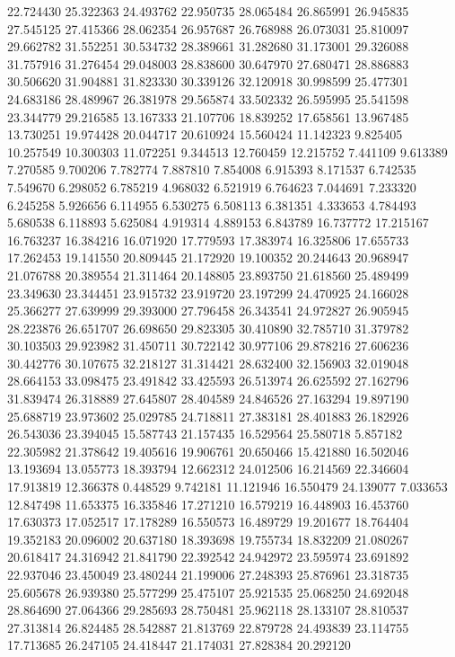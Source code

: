 22.724430
25.322363
24.493762
22.950735
28.065484
26.865991
26.945835
27.545125
27.415366
28.062354
26.957687
26.768988
26.073031
25.810097
29.662782
31.552251
30.534732
28.389661
31.282680
31.173001
29.326088
31.757916
31.276454
29.048003
28.838600
30.647970
27.680471
28.886883
30.506620
31.904881
31.823330
30.339126
32.120918
30.998599
25.477301
24.683186
28.489967
26.381978
29.565874
33.502332
26.595995
25.541598
23.344779
29.216585
13.167333
21.107706
18.839252
17.658561
13.967485
13.730251
19.974428
20.044717
20.610924
15.560424
11.142323
9.825405
10.257549
10.300303
11.072251
9.344513
12.760459
12.215752
7.441109
9.613389
7.270585
9.700206
7.782774
7.887810
7.854008
6.915393
8.171537
6.742535
7.549670
6.298052
6.785219
4.968032
6.521919
6.764623
7.044691
7.233320
6.245258
5.926656
6.114955
6.530275
6.508113
6.381351
4.333653
4.784493
5.680538
6.118893
5.625084
4.919314
4.889153
6.843789
16.737772
17.215167
16.763237
16.384216
16.071920
17.779593
17.383974
16.325806
17.655733
17.262453
19.141550
20.809445
21.172920
19.100352
20.244643
20.968947
21.076788
20.389554
21.311464
20.148805
23.893750
21.618560
25.489499
23.349630
23.344451
23.915732
23.919720
23.197299
24.470925
24.166028
25.366277
27.639999
29.393000
27.796458
26.343541
24.972827
26.905945
28.223876
26.651707
26.698650
29.823305
30.410890
32.785710
31.379782
30.103503
29.923982
31.450711
30.722142
30.977106
29.878216
27.606236
30.442776
30.107675
32.218127
31.314421
28.632400
32.156903
32.019048
28.664153
33.098475
23.491842
33.425593
26.513974
26.625592
27.162796
31.839474
26.318889
27.645807
28.404589
24.846526
27.163294
19.897190
25.688719
23.973602
25.029785
24.718811
27.383181
28.401883
26.182926
26.543036
23.394045
15.587743
21.157435
16.529564
25.580718
5.857182
22.305982
21.378642
19.405616
19.906761
20.650466
15.421880
16.502046
13.193694
13.055773
18.393794
12.662312
24.012506
16.214569
22.346604
17.913819
12.366378
0.448529
9.742181
11.121946
16.550479
24.139077
7.033653
12.847498
11.653375
16.335846
17.271210
16.579219
16.448903
16.453760
17.630373
17.052517
17.178289
16.550573
16.489729
19.201677
18.764404
19.352183
20.096002
20.637180
18.393698
19.755734
18.832209
21.080267
20.618417
24.316942
21.841790
22.392542
24.942972
23.595974
23.691892
22.937046
23.450049
23.480244
21.199006
27.248393
25.876961
23.318735
25.605678
26.939380
25.577299
25.475107
25.921535
25.068250
24.692048
28.864690
27.064366
29.285693
28.750481
25.962118
28.133107
28.810537
27.313814
26.824485
28.542887
21.813769
22.879728
24.493839
23.114755
17.713685
26.247105
24.418447
21.174031
27.828384
20.292120
